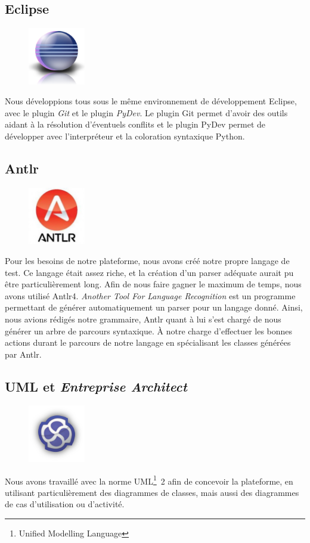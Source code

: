 \subsection{Eclipse}
\begin{figure}
	\vspace{-30px}
	\includegraphics[width=2.5cm]{contents/images/logoEclipse.png}
\end{figure}
Nous développions tous sous le même environnement de développement Eclipse, avec le plugin \textit{Git} et le plugin \textit{PyDev}. Le
plugin Git permet d'avoir des outils aidant à la résolution d'éventuels conflits et le plugin PyDev permet de développer avec l'interpréteur
et la coloration syntaxique Python. 

\subsection{Antlr}
\begin{figure}
	\includegraphics[width=2.5cm]{contents/images/antlr.jpg}
\end{figure}
Pour les besoins de notre plateforme, nous avons créé notre propre langage de test. Ce langage était assez riche, et la création d'un parser adéquate aurait pu être particulièrement long. Afin de nous faire gagner le maximum de temps, nous avons utilisé Antlr4.  \textit{Another Tool For Language Recognition} est un programme permettant de générer automatiquement un parser pour un langage donné. Ainsi, nous avions rédigés notre grammaire, Antlr quant à lui s'est chargé de nous générer un arbre de parcours syntaxique. À notre charge d'effectuer les bonnes actions durant le parcours de notre langage en spécialisant les classes générées par Antlr.
\newpage
\subsection{UML et \textit{Entreprise Architect}}
\begin{figure}
	\includegraphics[width=2.5cm]{contents/images/logoEnterpriseArchitect.png}
\end{figure}
Nous avons travaillé avec la norme UML\footnote{Unified Modelling Language}~2 afin de concevoir la plateforme, en utilisant particulièrement des diagrammes de classes, mais aussi des diagrammes de cas d'utilisation ou d'activité. 

